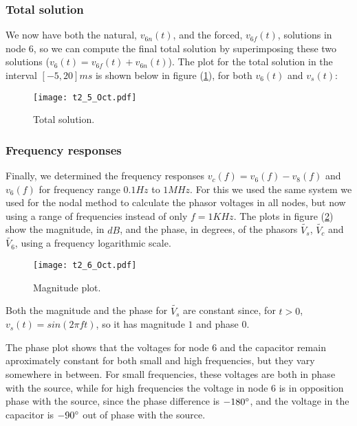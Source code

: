 \newpage

\subsubsection{Total solution}

We now have both the natural, $v_{6n}\left(t\right)$, and the forced, $v_{6f}\left(t\right)$,
 solutions in node $6$, so we can compute the final total solution by
  superimposing these two solutions ($v_{6}\left(t\right)=v_{6f}\left(t\right)+v_{6n}\left(t\right)$).
   The plot for the total solution in the interval $\left[-5,20\right] ms$ is shown below in
    figure (\ref{fig:t2_5_Oct}),
    for both $v_{6}\left(t\right)$ and $v_{s}\left(t\right)$:

\begin{figure}[h] \centering
  \texttt{[image: t2\_5\_Oct.pdf]}
  \caption{Total solution.}
  \label{fig:t2_5_Oct}
\end{figure}

\newpage

\subsubsection{Frequency responses}

Finally, we determined the frequency responses $v_{c}\left(f\right)=v_{6}\left(f\right)-v_{8}\left(f\right)$
 and $v_{6}\left(f\right)$ for frequency range $0.1 Hz$ to $1 MHz$.
  For this we used the same system we used for the nodal method to calculate the phasor 
  voltages in all nodes, but now using a range of frequencies instead of only $f=1KHz$.
The plots in figure (\ref{fig:t2_5_MagnitudeAndPhase}) 
show the magnitude, in $dB$, and the phase, in degrees, of the phasors $\tilde{V_{s}}$, 
$\tilde{V_{c}}$ and $\tilde{V_{6}}$, using a frequency logarithmic scale.

\begin{figure}[h] \centering
  \texttt{[image: t2\_6\_Oct.pdf]}
  \caption{Magnitude plot.}
  \label{fig:t2_5_MagnitudeAndPhase}
\end{figure}

Both the magnitude and the phase for $\tilde{V_{s}}$ are constant since, for $t>0$, $v_{s}\left(t\right)=sin\left(2\pi ft\right)$, so it has magnitude $1$ and phase $0$.  

The phase plot shows that the voltages for node $6$ and the capacitor remain aproximately constant 
for both small and high frequencies, but they vary somewhere in between. For small frequencies,
 these voltages are both in phase with the source, while for high frequencies the voltage in 
 node 6 is in opposition phase with the source, since the phase difference is $-180\degree$,
  and the voltage in the capacitor is $-90\degree$ out of phase with the source.

